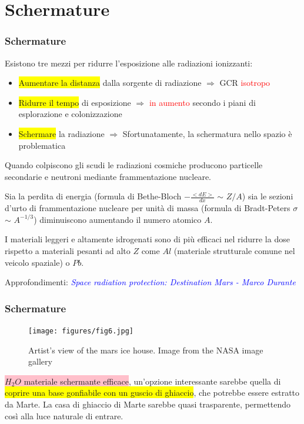 \documentclass[9pt]{beamer}
\begin{document}
\section{Schermature}
\begin{frame} [fragile]
	\frametitle{Schermature}
	\small
	
Esistono tre mezzi per ridurre l'esposizione alle radiazioni ionizzanti:
\begin{itemize}
\item \colorbox{yellow}{Aumentare la distanza} dalla sorgente di radiazione $\Longrightarrow$ GCR \textcolor{red}{isotropo}
\item \colorbox{yellow}{Ridurre il tempo} di esposizione $\Longrightarrow$ \textcolor{red}{in aumento} secondo i piani di esplorazione e colonizzazione
\item \colorbox{yellow}{Schermare} la radiazione $\Longrightarrow$ Sfortunatamente, la schermatura nello spazio \`e problematica
\end{itemize}


Quando colpiscono gli scudi le radiazioni cosmiche producono particelle secondarie e neutroni mediante frammentazione nucleare.
\newline

Sia la perdita di energia (formula di Bethe-Bloch $-\frac{<dE>}{dx}$ $\sim$ $Z$$/$$A$) \newline
sia le sezioni d'urto di frammentazione nucleare per unit\`a di massa (formula di Bradt-Peters $\sigma$ $\sim$ $A^{-1/3}$) diminuiscono aumentando il numero atomico $A$. 
\begin{block}{}
I materiali leggeri e altamente idrogenati sono di pi\`u efficaci nel ridurre la dose rispetto a materiali pesanti ad alto $Z$ come $Al$ (materiale strutturale comune nel veicolo spaziale) o $Pb$.
\end{block}
Approfondimenti: \textcolor{blue}{\textit{Space radiation protection: Destination Mars - Marco Durante}}
\end{frame}




\begin{frame} [fragile]
	\frametitle{Schermature}
	\begin{figure}
	  \centering
			\texttt{[image: figures/fig6.jpg]}
			\caption{Artist's view of the mars ice house. Image from the NASA image gallery}
		\end{figure}
\colorbox{pink}{$H_{2}O$  materiale schermante efficace}, un'opzione interessante sarebbe quella di \colorbox{yellow}{coprire una base gonfiabile con un guscio di ghiaccio}, che potrebbe essere estratto da Marte. La casa di ghiaccio di Marte sarebbe quasi trasparente, permettendo cos\`i alla luce naturale di entrare.
\end{frame}
\end{document}
